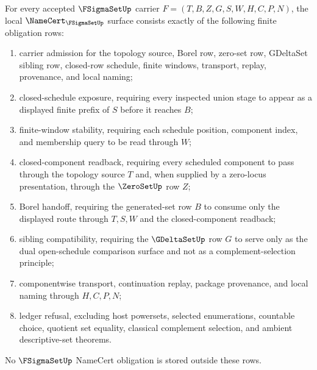 \begin{theorem}
\label{thm:f-sigma-set-namecert-obligations}
For every accepted $\FSigmaSetUp$ carrier $F=(T,B,Z,G,S,W,H,C,P,N)$, the local $\NameCert_{\FSigmaSetUp}$ surface consists exactly of the following finite obligation rows:
\begin{enumerate}
\item carrier admission for the topology source, Borel row, zero-set row, GDeltaSet sibling row, closed-row schedule, finite windows, transport, replay, provenance, and local naming;
\item closed-schedule exposure, requiring every inspected union stage to appear as a displayed finite prefix of $S$ before it reaches $B$;
\item finite-window stability, requiring each schedule position, component index, and membership query to be read through $W$;
\item closed-component readback, requiring every scheduled component to pass through the topology source $T$ and, when supplied by a zero-locus presentation, through the $\ZeroSetUp$ row $Z$;
\item Borel handoff, requiring the generated-set row $B$ to consume only the displayed route through $T,S,W$ and the closed-component readback;
\item sibling compatibility, requiring the $\GDeltaSetUp$ row $G$ to serve only as the dual open-schedule comparison surface and not as a complement-selection principle;
\item componentwise transport, continuation replay, package provenance, and local naming through $H,C,P,N$;
\item ledger refusal, excluding host powersets, selected enumerations, countable choice, quotient set equality, classical complement selection, and ambient descriptive-set theorems.
\end{enumerate}
No $\FSigmaSetUp$ NameCert obligation is stored outside these rows.
\end{theorem}
